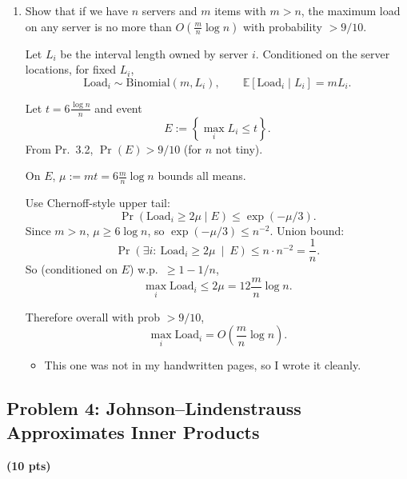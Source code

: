\documentclass[10pt]{article}
\newcommand{\spara}[1]{\vspace{.5em}\noindent {\large\sffamily\textcolor{nyuOfficialPurple}{#1}}}
\newcommand{\E}{\mathbb{E}}
\begin{document}
\begin{enumerate}[label=\arabic*.]
Fix a server. Probability that the next server clockwise is at distance at least $t$ is
\[
\Pr(\text{gap}\ge t)=(1-t)^{n-1}
\]
(since none of the other $(n-1)$ servers fall in that length-$t$ interval).

Union bound over $n$ gaps:
\[
\Pr(G_{\max}\ge t)\le n(1-t)^{n-1}\le n e^{-(n-1)t}.
\]

Pick $t=c\frac{\log n}{n}$:
\[
\Pr\!\left(G_{\max}\ge c\frac{\log n}{n}\right)
\le n\exp\!\left(-(n-1)c\frac{\log n}{n}\right)
\le n^{1-c/2}.
\]
Choose $c=6$, then $n^{1-c/2}=n^{-2}<1/10$ for $n\ge 4$.

So w.p.\ $>9/10$,
\[
G_{\max}\le 6\frac{\log n}{n}.
\]
\[
\boxed{\text{No server owns more than }O(\log n/n)\text{ w.p. } >9/10.}
\]


\item Show that if we have $n$ servers and $m$ items with $m > n$, the maximum load on any server is no more than $O\!\left(\frac{m}{n}\log n\right)$ with probability $> 9/10$.

\spara{Pr. 3.3}

Let $L_i$ be the interval length owned by server $i$.
Conditioned on the server locations, for fixed $L_i$,
\[
\text{Load}_i \sim \mathrm{Binomial}(m,L_i),
\qquad
\E[\text{Load}_i\mid L_i]=mL_i.
\]

Let $t=6\frac{\log n}{n}$ and event
\[
E:=\left\{\max_i L_i\le t\right\}.
\]
From Pr.\ 3.2, $\Pr(E)>9/10$ (for $n$ not tiny).

On $E$, $\mu:=mt=6\frac{m}{n}\log n$ bounds all means.

Use Chernoff-style upper tail:
\[
\Pr(\text{Load}_i\ge 2\mu\mid E)\le \exp(-\mu/3).
\]
Since $m>n$, $\mu\ge 6\log n$, so $\exp(-\mu/3)\le n^{-2}$.
Union bound:
\[
\Pr\left(\exists i:\ \text{Load}_i\ge 2\mu\ \middle|\ E\right)\le n\cdot n^{-2}=\frac{1}{n}.
\]
So (conditioned on $E$) w.p.\ $\ge 1-1/n$,
\[
\max_i \text{Load}_i\le 2\mu = 12\frac{m}{n}\log n.
\]

Therefore overall with prob $>9/10$,
\[
\boxed{\max_i \text{Load}_i = O\!\left(\frac{m}{n}\log n\right).}
\]

\spara{Notes for Problem 3}
\begin{itemize}
\item This one was not in my handwritten pages, so I wrote it cleanly.
\end{itemize}

\end{enumerate}



\subsection{Problem 4: Johnson--Lindenstrauss Approximates Inner Products}
\textbf{(10 pts)}
\end{document}
